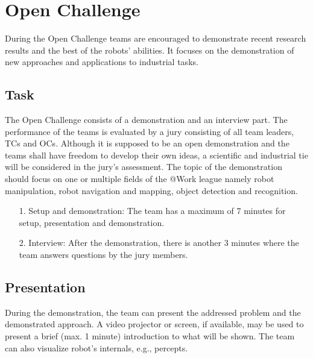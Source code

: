 

\newpage
\section{Open Challenge}
During the Open Challenge teams are encouraged to demonstrate recent research results and the best of the robots’ abilities. It focuses on the demonstration of new approaches and applications to industrial tasks.

\subsection{Task}

The Open Challenge consists of a demonstration and an interview part. The performance of the teams is evaluated by a jury consisting of all team leaders, TCs and OCs. Although it is supposed to be an open demonstration and the teams shall have freedom to develop their own ideas, a scientific and industrial tie will be considered in the jury's assessment. The topic of the demonstration should focus on one or multiple fields of the @Work league namely robot manipulation, robot navigation and mapping, object detection and recognition.

\begin{itemize}
\item[1.] Setup and demonstration: The team has a maximum of 7 minutes for setup, presentation and demonstration.
\item[2.] Interview: After the demonstration, there is another 3 minutes where the team answers questions by the jury members.
\end{itemize}

\subsection{Presentation}
During the demonstration, the team can present the addressed problem and the demonstrated approach.
A video projector or screen, if available, may be used to present a brief (max. 1 minute) introduction to what will be shown. The team can also visualize robot’s internals, e.g., percepts.

